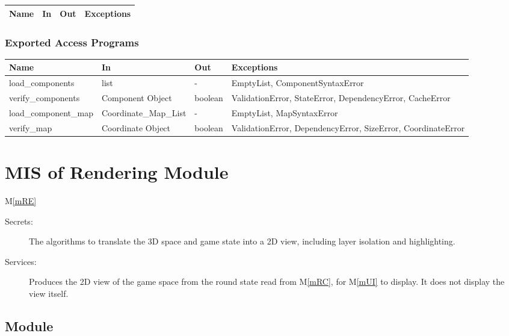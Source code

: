 \documentclass[12pt, titlepage]{article}
\newcommand{\mref}[1]{M\ref{#1}}
\begin{document}
\begin{center}
\begin{tabular}{p{3cm} p{4cm} p{4cm} p{2cm}}
\hline
\textbf{Name} & \textbf{In} & \textbf{Out} & \textbf{Exceptions} \\
\hline


\hline
\end{tabular}
\end{center}

\subsubsection{Exported Access Programs}

\begin{center}
\begin{tabular}{p{4cm} p{4cm} p{4cm} p{4cm}}
\hline
\textbf{Name} & \textbf{In} & \textbf{Out} & \textbf{Exceptions} \\
\hline
load\_components & list & - & EmptyList, ComponentSyntaxError \\
verify\_components & Component Object & boolean & ValidationError, StateError, DependencyError, CacheError   \\
load\_component\_map & Coordinate\_Map\_List & - & EmptyList, MapSyntaxError \\
verify\_map & Coordinate Object & boolean & ValidationError, DependencyError, SizeError, CoordinateError \\

\hline
\end{tabular}
\end{center}

\newpage

\section{MIS of Rendering Module} \mref{mRE} 

\begin{description}
\item[Secrets:] The algorithms to translate the 3D space and game state into a 2D view, including layer isolation and highlighting.
\item[Services:] Produces the 2D view of the game space from the round state read from \mref{mRC}, for \mref{mUI} to display. It does not display the view itself.
\end{description}

\subsection{Module}
\end{document}
